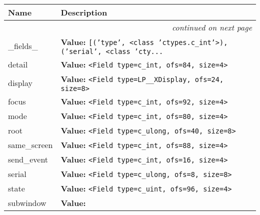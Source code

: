     \vspace{-1cm}
\hspace{\varindent}\begin{longtable}{|p{\varnamewidth}|p{\vardescrwidth}|l}
\cline{1-2}
\cline{1-2} \centering \textbf{Name} & \centering \textbf{Description}& \\
\cline{1-2}
\endhead\cline{1-2}\multicolumn{3}{r}{\small\textit{continued on next page}}\\\endfoot\cline{1-2}
\endlastfoot\raggedright \_\-f\-i\-e\-l\-d\-s\-\_\- & \raggedright \textbf{Value:} 
{\tt \texttt{[}\texttt{(}\texttt{'}\texttt{type}\texttt{'}\texttt{, }{\textless}class 'ctypes.c\_int'{\textgreater}\texttt{)}\texttt{, }\texttt{(}\texttt{'}\texttt{serial}\texttt{'}\texttt{, }{\textless}class 'cty\texttt{...}}&\\
\cline{1-2}
\raggedright d\-e\-t\-a\-i\-l\- & \raggedright \textbf{Value:} 
{\tt {\textless}Field type=c\_int, ofs=84, size=4{\textgreater}}&\\
\cline{1-2}
\raggedright d\-i\-s\-p\-l\-a\-y\- & \raggedright \textbf{Value:} 
{\tt {\textless}Field type=LP\_\_XDisplay, ofs=24, size=8{\textgreater}}&\\
\cline{1-2}
\raggedright f\-o\-c\-u\-s\- & \raggedright \textbf{Value:} 
{\tt {\textless}Field type=c\_int, ofs=92, size=4{\textgreater}}&\\
\cline{1-2}
\raggedright m\-o\-d\-e\- & \raggedright \textbf{Value:} 
{\tt {\textless}Field type=c\_int, ofs=80, size=4{\textgreater}}&\\
\cline{1-2}
\raggedright r\-o\-o\-t\- & \raggedright \textbf{Value:} 
{\tt {\textless}Field type=c\_ulong, ofs=40, size=8{\textgreater}}&\\
\cline{1-2}
\raggedright s\-a\-m\-e\-\_\-s\-c\-r\-e\-e\-n\- & \raggedright \textbf{Value:} 
{\tt {\textless}Field type=c\_int, ofs=88, size=4{\textgreater}}&\\
\cline{1-2}
\raggedright s\-e\-n\-d\-\_\-e\-v\-e\-n\-t\- & \raggedright \textbf{Value:} 
{\tt {\textless}Field type=c\_int, ofs=16, size=4{\textgreater}}&\\
\cline{1-2}
\raggedright s\-e\-r\-i\-a\-l\- & \raggedright \textbf{Value:} 
{\tt {\textless}Field type=c\_ulong, ofs=8, size=8{\textgreater}}&\\
\cline{1-2}
\raggedright s\-t\-a\-t\-e\- & \raggedright \textbf{Value:} 
{\tt {\textless}Field type=c\_uint, ofs=96, size=4{\textgreater}}&\\
\cline{1-2}
\raggedright s\-u\-b\-w\-i\-n\-d\-o\-w\- & \raggedright \textbf{Value:} 

\end{longtable}
